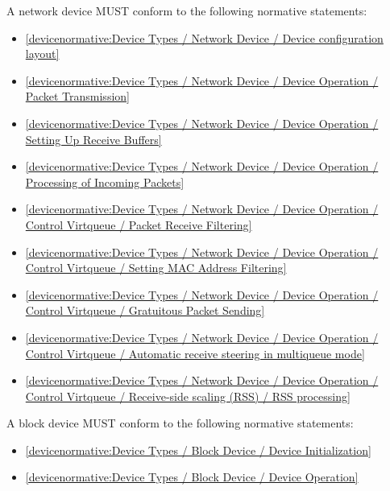 A network device MUST conform to the following normative statements:

\begin{itemize}
\item \ref{devicenormative:Device Types / Network Device / Device configuration layout}
\item \ref{devicenormative:Device Types / Network Device / Device Operation / Packet Transmission}
\item \ref{devicenormative:Device Types / Network Device / Device Operation / Setting Up Receive Buffers}
\item \ref{devicenormative:Device Types / Network Device / Device Operation / Processing of Incoming Packets}
\item \ref{devicenormative:Device Types / Network Device / Device Operation / Control Virtqueue / Packet Receive Filtering}
\item \ref{devicenormative:Device Types / Network Device / Device Operation / Control Virtqueue / Setting MAC Address Filtering}
\item \ref{devicenormative:Device Types / Network Device / Device Operation / Control Virtqueue / Gratuitous Packet Sending}
\item \ref{devicenormative:Device Types / Network Device / Device Operation / Control Virtqueue / Automatic receive steering in multiqueue mode}
\item \ref{devicenormative:Device Types / Network Device / Device Operation / Control Virtqueue / Receive-side scaling (RSS) / RSS processing}
\end{itemize}

\label{sec:Conformance / Device Conformance / Block Device Conformance}

A block device MUST conform to the following normative statements:

\begin{itemize}
\item \ref{devicenormative:Device Types / Block Device / Device Initialization}
\item \ref{devicenormative:Device Types / Block Device / Device Operation}
\end{itemize}

\label{sec:Conformance / Device Conformance / Console Device Conformance}

